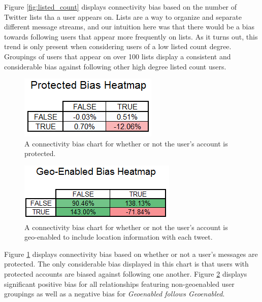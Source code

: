 Figure \ref{fig:listed_count} displays connectivity bias based on the number of Twitter lists tha a user appears on.  Lists are a way to organize and separate different message streams, and our intuition here was that there would be a bias towards following users that appear more frequently on lists.  As it turns out, this trend is only present when considering users of a low listed count degree.  Groupings of users that appear on over 100 lists display a consistent and considerable bias against following other high degree listed count users.

\begin{figure}[h]
 \centering
 \includegraphics[bb=0 0 188 86, scale=.5]{./images/protected.png}
 \caption{A connectivity bias chart for whether or not the user's account is protected.}
 \label{fig:protected}
\end{figure}

\begin{figure}[h]
 \centering
 \includegraphics[bb=0 0 214 80, scale=.5]{./images/geoenabled.png}
 \caption{A connectivity bias chart for whether or not the user's account is geo-enabled to include location information with each tweet.}
 \label{fig:geoenabled}
\end{figure}

Figure \ref{fig:protected} displays connectivity bias based on whether or not a user's messages are protected.  The only considerable bias displayed in this chart is that users with protected accounts are biased against following one another.  Figure \ref{fig:geoenabled} displays significant positive bias for all relationships featuring non-geoenabled user groupings as well as a negative bias for \textit{Geoenabled follows Geoenabled}.

